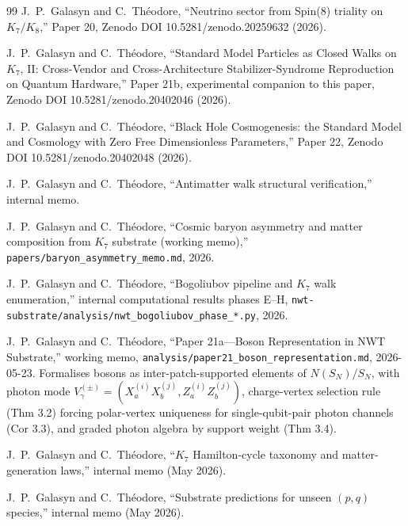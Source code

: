 \documentclass[11pt]{article}
\begin{document}
\begin{thebibliography}{99}
 J.~P.~Galasyn and C.~Th\'eodore, ``Neutrino sector from Spin(8) triality on $K_7/K_8$,'' Paper 20, Zenodo DOI 10.5281/zenodo.20259632 (2026).

 J.~P.~Galasyn and C.~Th\'eodore, ``Standard Model Particles as Closed Walks on $K_7$, II: Cross-Vendor and Cross-Architecture Stabilizer-Syndrome Reproduction on Quantum Hardware,'' Paper 21b, experimental companion to this paper, Zenodo DOI 10.5281/zenodo.20402046 (2026).

 J.~P.~Galasyn and C.~Th\'eodore, ``Black Hole Cosmogenesis: the Standard Model and Cosmology with Zero Free Dimensionless Parameters,'' Paper 22, Zenodo DOI 10.5281/zenodo.20402048 (2026).

 J.~P.~Galasyn and C.~Th\'eodore, ``Antimatter walk structural verification,'' internal memo.

 J.~P.~Galasyn and C.~Th\'eodore, ``Cosmic baryon asymmetry and matter composition from $K_7$ substrate (working memo),'' \texttt{papers/baryon\_asymmetry\_memo.md}, 2026.

 J.~P.~Galasyn and C.~Th\'eodore, ``Bogoliubov pipeline and $K_7$ walk enumeration,'' internal computational results phases E--H, \texttt{nwt-substrate/analysis/nwt\_bogoliubov\_phase\_*.py}, 2026.

 J.~P.~Galasyn and C.~Th\'eodore, ``Paper 21a---Boson Representation in NWT Substrate,'' working memo, \texttt{analysis/paper21\_boson\_representation.md}, 2026-05-23.  Formalises bosons as inter-patch-supported elements of $N(S_N)/S_N$, with photon mode $V_\gamma^{(\pm)} = (X_a^{(i)} X_b^{(j)}, Z_a^{(i)} Z_b^{(j)})$, charge-vertex selection rule (Thm 3.2) forcing polar-vertex uniqueness for single-qubit-pair photon channels (Cor 3.3), and graded photon algebra by support weight (Thm 3.4).

 J.~P.~Galasyn and C.~Th\'eodore, ``$K_7$ Hamilton-cycle taxonomy and matter-generation laws,'' internal memo (May 2026).

 J.~P.~Galasyn and C.~Th\'eodore, ``Substrate predictions for unseen $(p, q)$ species,'' internal memo (May 2026).

\end{thebibliography}
\end{document}
